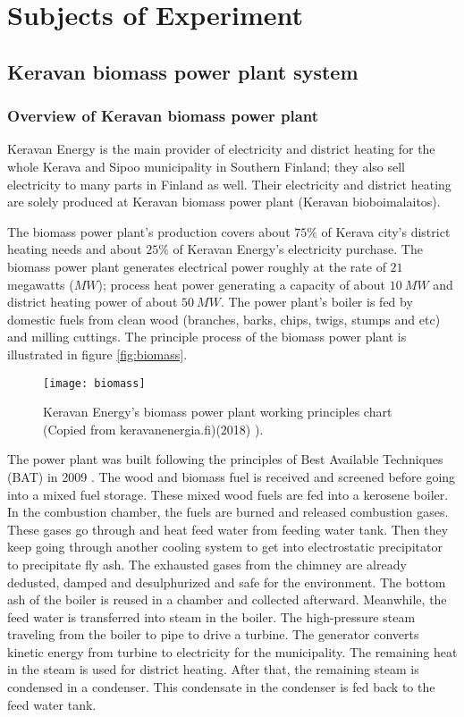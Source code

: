 
\chapter{Subjects of Experiment}

\section{Keravan biomass power plant system}

\subsection{Overview of Keravan biomass power plant}

Keravan Energy is the main provider of electricity and district heating for the whole Kerava and Sipoo municipality in Southern Finland; they also sell electricity to many parts in Finland as well. Their electricity and district heating are solely produced at Keravan biomass power plant (Keravan bioboimalaitos).\cite{kerava:web}

The biomass power plant's production covers about $75\%$  of Kerava city's district heating needs and about $25\%$ of Keravan Energy's electricity purchase. The biomass power plant generates electrical power roughly at the rate of $21$ megawatts ($MW$); process heat power generating a capacity of about $10\ MW$ and district heating power of about $50\ MW$. The power plant's boiler is fed by domestic fuels from clean wood (branches, barks, chips, twigs, stumps and etc) and milling cuttings. The principle process of the biomass power plant is illustrated in figure \vref{fig:biomass}.

\begin{figure}[h]
  \centering
  \texttt{[image: biomass]}
  \caption{ Keravan Energy's biomass power plant working principles chart (Copied from keravanenergia.fi)(2018) \cite{kerava:web}).}
  \label{fig:biomass}
\end{figure}

The power plant was built following the principles of Best Available Techniques (BAT) in 2009 \cite{kerava:web}. The wood and biomass fuel is received and screened before going into a mixed fuel storage. These mixed wood fuels are fed into a kerosene boiler. In the combustion chamber, the fuels are burned and released combustion gases. These gases go through and heat feed water from feeding water tank. Then they keep going through another cooling system to get into electrostatic precipitator to precipitate fly ash. The exhausted gases from the chimney are already dedusted, damped and desulphurized and safe for the environment. The bottom ash of the boiler is reused in a chamber and collected afterward. Meanwhile, the feed water is transferred into steam in the boiler. The high-pressure steam traveling from the boiler to pipe to drive a turbine. The generator converts kinetic energy from turbine to electricity for the municipality. The remaining heat in the steam is used for district heating. After that, the remaining steam is condensed in a condenser. This condensate in the condenser is fed back to the feed water tank.


